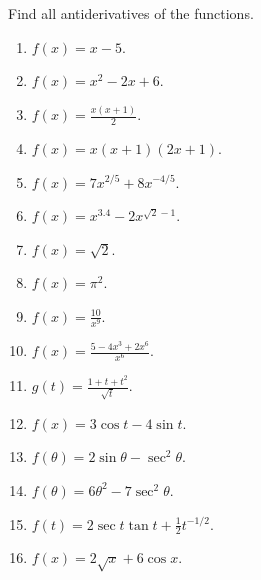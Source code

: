 Find all antiderivatives of the functions.
\begin{multicols}{3}
\begin{enumerate}
\item $f(x)=x-5$.


\item $f(x)= x^2-2x+6$.


\item $f(x)=\frac{x(x+1)}{2} $.


\item $f(x)=x(x+1)(2x+1)$.


\item $f(x)=7x^{2/5}+8x^{-4/5}$.
\item $f(x)=x^{3.4}-2x^{\sqrt{2}-1}$.

\item $f(x)=\sqrt {2}$.
\item $f(x)=\pi^2$.

\item $f(x)=\frac{10}{x^9}$.
\item $f(x)=\frac{5-4x^3+2x^6}{x^6}$.

\item $g(t)=\frac{1+t+t^2}{\sqrt{t}}$.
\item $f(x)=3\cos t-4\sin t$.

\item $f(\theta)=2\sin \theta-\sec^2\theta$.
\item $f(\theta)=6\theta^2-7\sec^2\theta$.

\item $f(t)=2\sec t \tan t +\frac12 t^{-1/2}$.
\item $f(x)=2\sqrt{x}+6\cos x$.

\end{enumerate}
\end{multicols}